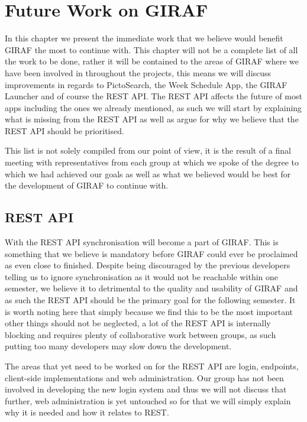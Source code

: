 \chapter{Future Work on GIRAF}\label{chp:futureworks}
In this chapter we present the immediate work that we believe would benefit GIRAF the most to continue with.
This chapter will not be a complete list of all the work to be done, rather it will be contained to the areas of GIRAF where we have been involved in throughout the projects, this means we will discuss improvements in regards to PictoSearch, the Week Schedule App, the GIRAF Launcher and of course the REST API.
The REST API affects the future of most apps including the ones we already mentioned, as such we will start by explaining what is missing from the REST API as well as argue for why we believe that the REST API should be prioritised.

This list is not solely compiled from our point of view, it is the result of a final meeting with representatives from each group at which we spoke of the degree to which we had achieved our goals as well as what we believed would be best for the development of GIRAF to continue with.

\section{REST API}
With the REST API synchronisation will become a part of GIRAF.
This is something that we believe is mandatory before GIRAF could ever be proclaimed as even close to finished.
Despite being discouraged by the previous developers telling us to ignore synchronisation as it would not be reachable within one semester, we believe it to detrimental to the quality and usability of GIRAF and as such the REST API should be the primary goal for the following semester.
It is worth noting here that simply because we find this to be the most important other things should not be neglected, a lot of the REST API is internally blocking and requires plenty of collaborative work between groups, as such putting too many developers may slow down the development.

The areas that yet need to be worked on for the REST API are login, endpoints, client-side implementations and web administration.
Our group has not been involved in developing the new login system and thus we will not discuss that further, web administration is yet untouched so for that we will simply explain why it is needed and how it relates to REST. 
